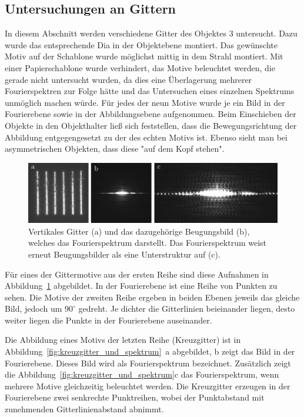 \subsection{Untersuchungen an Gittern}
In diesem Abschnitt werden verschiedene Gitter des Objektes 3 untersucht. Dazu wurde das entsprechende Dia in der Objektebene montiert. Das gewünschte Motiv auf der Schablone wurde möglichst mittig in dem Strahl montiert. Mit einer Papierschablone wurde verhindert, das Motive beleuchtet werden, die gerade nicht untersucht wurden, da dies eine Überlagerung mehrerer Fourierspektren zur Folge hätte und das Untersuchen eines einzelnen Spektrums unmöglich machen würde. Für jedes der neun Motive wurde je ein Bild in der Fourierebene sowie in der Abbildungsebene aufgenommen. Beim Einschieben der Objekte in den Objekthalter ließ sich feststellen, dass die Bewegungsrichtung der Abbildung entgegengesetzt zu der des echten Motivs ist. Ebenso sieht man bei asymmetrischen Objekten, dass diese "auf dem Kopf stehen".


\begin{figure}[ht]
	\centering
	\includegraphics{images/Regina/abb13.pdf}
	\caption[Gitter mit Fourierspektrum]{
		Vertikales Gitter (a) und das dazugehörige Beugungsbild (b), welches das Fourierspektrum darstellt. Das Fourierspektrum weist erneut Beugungsbilder als eine Unterstruktur auf (c).
	}
	\label{fig:gitter_und_spektrum}
\end{figure}

Für eines der Gittermotive aus der ersten Reihe sind diese Aufnahmen in Abbildung~\ref{fig:gitter_und_spektrum} abgebildet. In der Fourierebene ist eine Reihe von Punkten zu sehen. Die Motive der zweiten Reihe ergeben in beiden Ebenen jeweils das gleiche Bild, jedoch um $90^\circ$ gedreht. Je dichter die Gitterlinien beieinander liegen, desto weiter liegen die Punkte in der Fourierebene auseinander.

Die Abbildung eines Motivs der letzten Reihe (Kreuzgitter) ist in Abbildung~\ref{fig:kreuzgitter_und_spektrum}~a abgebildet, b zeigt das Bild in der Fourierebene. Dieses Bild wird als Fourierspektrum bezeichnet. Zusätzlich zeigt die Abbildung~\ref{fig:kreuzgitter_und_spektrum}c das Fourierspektrum, wenn mehrere Motive gleichzeitig beleuchtet werden. Die Kreuzgitter erzeugen in der Fourierebene zwei senkrechte Punktreihen, wobei der Punktabstand mit zunehmenden Gitterlinienabstand abnimmt.

